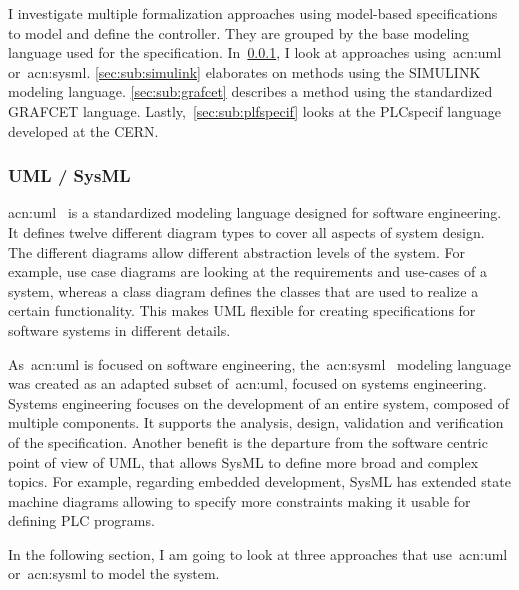 I investigate multiple formalization approaches using model-based specifications to model and define the controller.
They are grouped by the base modeling language used for the specification.
In~\ref{sec:sub:uml}, I look at approaches using~\acrshort{acn:uml} or~\acrlong{acn:sysml}.
\ref{sec:sub:simulink} elaborates on methods using the SIMULINK modeling language.
\ref{sec:sub:grafcet} describes a method using the standardized GRAFCET language.
Lastly,~\ref{sec:sub:plfspecif} looks at the PLCspecif language developed at the CERN.

\subsubsection{UML / SysML}
\label{sec:sub:uml}

\acrfull{acn:uml}~\cite{UML:2-5-1} is a standardized modeling language designed for software engineering.
It defines twelve different diagram types to cover all aspects of system design.
The different diagrams allow different abstraction levels of the system.
For example, use case diagrams are looking at the requirements and use-cases of a system, whereas a class diagram defines the classes that are used to realize a certain functionality.
This makes UML flexible for creating specifications for software systems in different details.

As~\acrshort{acn:uml} is focused on software engineering, the~\acrfull{acn:sysml}~\cite{SysML:1-6} modeling language was created as an adapted subset of~\acrshort{acn:uml}, focused on systems engineering.
Systems engineering focuses on the development of an entire system, composed of multiple components.
It supports the analysis, design, validation and verification of the specification.
Another benefit is the departure from the software centric point of view of UML, that allows SysML to define more broad and complex topics.
For example, regarding embedded development, SysML has extended state machine diagrams allowing to specify more constraints making it usable for defining PLC programs.

In the following section, I am going to look at three approaches that use~\acrshort{acn:uml} or~\acrshort{acn:sysml} to model the system.

